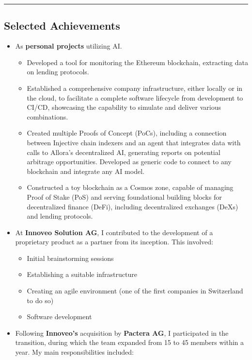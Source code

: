 \begin{center}\rule{0.5\linewidth}{0.5pt}\end{center}

\subsection{Selected Achievements}\label{selected-achievements}

\begin{itemize}
\tightlist
\item
  As \textbf{personal projects} utilizing AI.

  \begin{itemize}
  \tightlist
  \item
    Developed a tool for monitoring the Ethereum blockchain, extracting
    data on lending protocols.
  \item
    Established a comprehensive company infrastructure, either locally
    or in the cloud, to facilitate a complete software lifecycle from
    development to CI/CD, showcasing the capability to simulate and
    deliver various combinations.
  \item
    Created multiple Proofs of Concept (PoCs), including a connection
    between Injective chain indexers and an agent that integrates data
    with calls to Allora's decentralized AI, generating reports on
    potential arbitrage opportunities. Developed as generic code to
    connect to any blockchain and integrate any AI model.
  \item
    Constructed a toy blockchain as a Cosmos zone, capable of managing
    Proof of Stake (PoS) and serving foundational building blocks for
    decentralized finance (DeFi), including decentralized exchanges
    (DeXs) and lending protocols.
  \end{itemize}
\item
  At \textbf{Innoveo Solution AG}, I contributed to the development of a
  proprietary product as a partner from its inception. This involved:

  \begin{itemize}
  \tightlist
  \item
    Initial brainstorming sessions
  \item
    Establishing a suitable infrastructure
  \item
    Creating an agile environment (one of the first companies in
    Switzerland to do so)
  \item
    Software development
  \end{itemize}
\item
  Following \textbf{Innoveo's} acquisition by \textbf{Pactera AG}, I
  participated in the transition, during which the team expanded from 15
  to 45 members within a year. My main responsibilities included:


\end{itemize}
